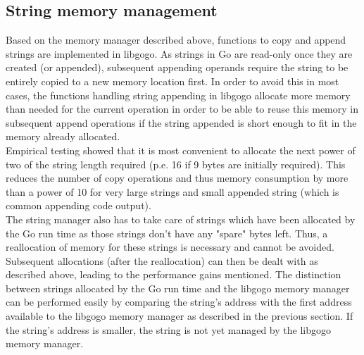 \documentclass[a4paper]{scrartcl}
\let\section\subsection
\let\subsection\subsubsection
\let\subsubsection\paragraph
\let\paragraph\subparagraph
\let\subparagraph\undefined
\begin{document}
    \section{String memory management}
      Based on the memory manager described above, functions to copy and append strings are implemented in libgogo. As strings in Go are read-only once they are created (or appended), subsequent appending operands require the string to be entirely copied to a new memory location first. In order to avoid this in most cases, the functions handling string appending in libgogo allocate more memory than needed for the current operation in order to be able to reuse this memory in subsequent append operations if the string appended is short enough to fit in the memory already allocated.\\
      Empirical testing showed that it is most convenient to allocate the next power of two of the string length required (p.e. 16 if 9 bytes are initially required). This reduces the number of copy operations and thus memory consumption by more than a power of 10 for very large strings and small appended string (which is common appending code output).\\
      The string manager also has to take care of strings which have been allocated by the Go run time as those strings don't have any "spare" bytes left. Thus, a reallocation of memory for these strings is necessary and cannot be avoided. Subsequent allocations (after the reallocation) can then be dealt with as described above, leading to the performance gains mentioned. The distinction between strings allocated by the Go run time and the libgogo memory manager can be performed easily by comparing the string's address with the first address available to the libgogo memory manager as described in the previous section. If the string's address is smaller, the string is not yet managed by the libgogo memory manager.
        
\end{document}
